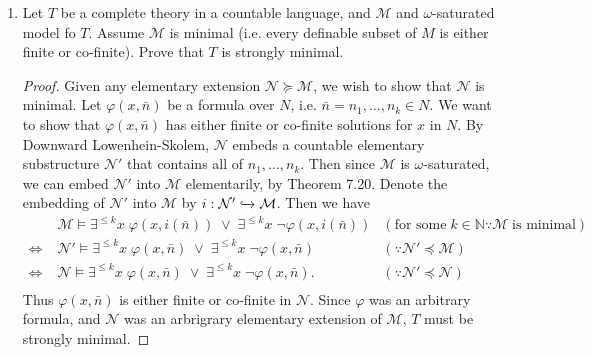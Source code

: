 \documentclass{article}
\begin{document}
\begin{enumerate}[label={\bf Q\arabic*:}]
  \item Let $T$ be a complete theory in a countable language, and
    $\mathcal{M}$ and $\omega$-saturated model fo $T$. Assume $\mathcal{M}$
    is minimal (i.e. every definable subset of $M$ is either finite or
    co-finite). Prove that $T$ is strongly minimal.

    \begin{proof}

      Given any elementary extension $\mathcal{N}\succeq\mathcal{M}$, we
      wish to show that $\mathcal{N}$ is minimal. Let $\varphi(x,\bar{n})$
      be a formula over $N$, i.e. $\bar{n}=n_1,\ldots,n_k\in N$. We want to
      show that $\varphi(x,\bar{n})$ has either finite or co-finite
      solutions for $x$ in $N$. By Downward Lowenhein-Skolem, $\mathcal{N}$
      embeds a countable elementary substructure $\mathcal{N}'$ that
      contains all of $n_1,\ldots,n_k$. Then since $\mathcal{M}$ is
      $\omega$-saturated, we can embed $\mathcal{N}'$ into $\mathcal{M}$
      elementarily, by Theorem 7.20. Denote the embedding of $\mathcal{N}'$
      into $\mathcal{M}$ by $i:\mathcal{N}'\xhookrightarrow{}\mathcal{M}$.
      Then we have
      \begin{align*}
          &\mathcal{M}\models \exists^{\leq k}x\; \varphi(x,i(\bar{n}))\;
          \vee\; \exists^{\leq k}x\; \neg\varphi(x,i(\bar{n})) &
          (\text{for some}\; k\in\mathbb{N}\because\mathcal{M}\; \text{is
          minimal}) \\
        \Leftrightarrow\; &\mathcal{N}'\models \exists^{\leq k}x\;
          \varphi(x,\bar{n})\; \vee\; \exists^{\leq k}x\;
          \neg\varphi(x,\bar{n}) &
          (\because\mathcal{N}'\preceq\mathcal{M}) \\
        \Leftrightarrow\; &\mathcal{N}\models \exists^{\leq k}x\;
          \varphi(x,\bar{n})\; \vee\; \exists^{\leq k}x\;
          \neg\varphi(x,\bar{n}). &
          (\because\mathcal{N}'\preceq\mathcal{N}) \\
      \end{align*}
      Thus $\varphi(x,\bar{n})$ is either finite or co-finite in
      $\mathcal{N}$. Since $\varphi$ was an arbitrary formula, and
      $\mathcal{N}$ was an arbrigrary elementary extension of
      $\mathcal{M}$, $T$ must be strongly minimal.
    \end{proof}


\end{enumerate}
\end{document}
